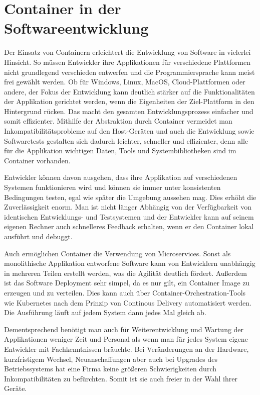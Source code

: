 \section{Container in der Softwareentwicklung} 
\label{sec:Softwareentwicklung}

Der Einsatz von Containern erleichtert die Entwicklung von Software in vielerlei Hinsicht. So müssen Entwickler ihre Applikationen für verschiedene Plattformen nicht grundlegend verschieden entwerfen und die Programmiersprache kann meist frei gewählt werden. 
Ob für Windows, Linux, MacOS, Cloud-Plattformen oder andere, der Fokus der Entwicklung kann deutlich stärker auf die Funktionalitäten der Applikation gerichtet werden, wenn die Eigenheiten der Ziel-Plattform in den Hintergrund rücken. Das macht den gesamten Entwicklungsprozess einfacher und somit effizienter.
Mithilfe der Abstraktion durch Container vermeidet man Inkompatibilitätsprobleme auf den Host-Geräten und auch die Entwicklung sowie Softwaretests gestalten sich dadurch leichter, schneller und effizienter, denn alle für die Applikation wichtigen Daten, Tools und Systembibliotheken sind im Container vorhanden.
\cite{11517836120160501}

Entwickler können davon ausgehen, dass ihre Applikation auf verschiedenen Systemen funktionieren wird und können sie immer unter konsistenten Bedingungen testen, egal wie später die Umgebung aussehen mag. Dies erhöht die Zuverlässigkeit enorm. Man ist nicht länger Abhängig von der Verfügbarkeit von identischen Entwicklungs- und Testsystemen und der Entwickler kann auf seinem eigenen Rechner auch schnelleres Feedback erhalten, wenn er den Container lokal ausführt und debuggt.

Auch ermöglichen Container die Verwendung von Microservices. Sonst als monolithische Applikation entworfene Software kann von Entwicklern unabhängig in mehreren Teilen erstellt werden, was die Agilität deutlich fördert.
Außerdem ist das Software Deployment sehr simpel, da es nur gilt, ein Container Image zu erzeugen und zu verteilen. Dies kann auch über Container-Orchestration-Tools wie Kubernetes nach dem Prinzip von Continous Delivery automatisiert werden. Die Ausführung läuft auf jedem System dann jedes Mal gleich ab.
\cite{ItAgil}

Dementsprechend benötigt man auch für Weiterentwicklung und Wartung der Applikationen weniger Zeit und Personal als wenn man für jedes System eigene Entwickler mit Fachkenntnissen bräuchte.
Bei Veränderungen an der Hardware, kurzfristigem Wechsel, Neuanschaffungen aber auch bei Upgrades des Betriebssystems hat eine Firma keine größeren Schwierigkeiten durch Inkompatibilitäten zu befürchten. Somit ist sie auch freier in der Wahl ihrer Geräte.

